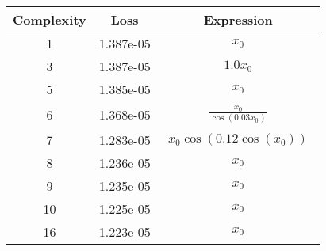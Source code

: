 \begin{center}
        \begin{tabular}{|c|c|c|}
        \hline
        Complexity & Loss & Expression \\
        \hline
        1 & 1.387e-05 & $\begin{aligned}x_{0}\end{aligned}$\\ \hline3 & 1.387e-05 & $\begin{aligned}1.0 x_{0}\end{aligned}$\\ \hline5 & 1.385e-05 & $\begin{aligned}x_{0}\end{aligned}$\\ \hline6 & 1.368e-05 & $\begin{aligned}\frac{x_{0}}{\cos{\left(0.03 x_{0} \right)}}\end{aligned}$\\ \hline7 & 1.283e-05 & $\begin{aligned}x_{0} \cos{\left(0.12 \cos{\left(x_{0} \right)} \right)}\end{aligned}$\\ \hline8 & 1.236e-05 & $\begin{aligned}x_{0}\end{aligned}$\\ \hline9 & 1.235e-05 & $\begin{aligned}x_{0}\end{aligned}$\\ \hline10 & 1.225e-05 & $\begin{aligned}x_{0}\end{aligned}$\\ \hline16 & 1.223e-05 & $\begin{aligned}x_{0}\end{aligned}$\\ \hline\end{tabular}
        \end{center}
        